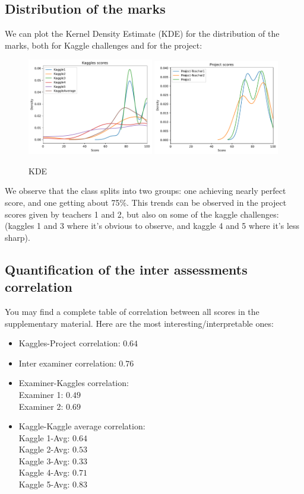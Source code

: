 \documentclass[a4paper]{article}
\begin{document}
	\subsection{Distribution of the marks}
	We can plot the Kernel Density Estimate (KDE) for the distribution of the marks, both for Kaggle challenges and for the project:
	\begin{figure}
		\centering
		\includegraphics[width=0.49\textwidth]{figures/kaggles_densities.pdf}
		\includegraphics[width=0.49\textwidth]{figures/project_densities.pdf}
		\caption{KDE}
		\label{fig:KDE}
	\end{figure}
	We observe that the class splits into two groups: one achieving nearly perfect score, and one getting about 75\%.
	This trends can be observed in the project scores given by teachers 1 and 2, but also on some of the kaggle challenges: (kaggles 1 and 3 where it's obvious to observe, and kaggle 4 and 5 where it's less sharp).
	
	\subsection{Quantification of the inter assessments correlation}
	You may find a complete table of correlation between all scores in the supplementary material.
	Here are the most interesting/interpretable ones:
	\begin{itemize}
		\item Kaggles-Project correlation: $0.64$
		\item Inter examiner correlation: $0.76$
		\item Examiner-Kaggles correlation:\\
		Examiner 1: $0.49$\\
		Examiner 2: $0.69$
		\item Kaggle-Kaggle average correlation:\\
		Kaggle 1-Avg: $0.64$\\
		Kaggle 2-Avg: $0.53$\\
		Kaggle 3-Avg: $0.33$\\
		Kaggle 4-Avg: $0.71$\\
		Kaggle 5-Avg: $0.83$
	\end{itemize}
	
\end{document}
